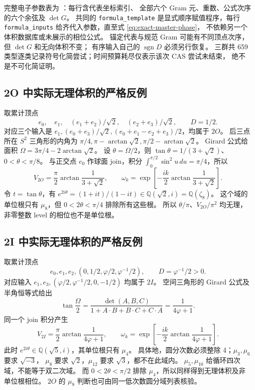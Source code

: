 完整电子参数表为 ：每行含代表坐标索引、
全部六个 Gram 元、重数、公式次序的六个余弦及 $\det G$。
共同的 \texttt{formula\_template} 是显式顺序赋值程序，每行
\texttt{formula\_inputs} 给齐代入参数，直至式 \eqref{eq:exact-master-phase}，
不依赖另一个体积数据库或未展示的相位公式。
锚定代表与规范 Gram 可能有不同顶点次序，但 $\det G$ 和无向体积不变；
有序输入自己的 $\operatorname{sgn}D$ 必须另行恢复。
三群共 659 类型逐类记录符号化简尝试；时间预算耗尽仅表示该次 CAS 尝试未结束，
绝不是不可化简证明。

\subsection{2O 中实际无理体积的严格反例}

取累计顶点
\[
e_0,\quad e_1,\quad (e_1+e_2)/\sqrt2,\quad(e_2+e_3)/\sqrt2,
\qquad D=1/2.
\]
对应三个输入是 $e_1,(e_0+e_3)/\sqrt2,(e_0+e_1-e_2+e_3)/2$，均属于 $2O$。
后三点所在 $S^2$ 三角形的内角为
$\pi/4,\pi-\arctan\sqrt2,\pi/2-\arctan\sqrt2$。
Girard 公式给面积 $\Omega=3\pi/4-2\arctan\sqrt2$。
设 $\theta=\Omega/2$，则
$\tan\theta=1/(3+\sqrt2)$、$0<\theta<\pi/8$。
与正交点 $e_0$ 作球面 join，积分 $\int_0^{\pi/2}\sin^2u\,du=\pi/4$，所以
\begin{equation}
\boxed{V_{2O}=\frac\pi2\arctan\frac1{3+\sqrt2}},\qquad
\omega_k=\exp\left[-\frac{ik}{2}\arctan\frac1{3+\sqrt2}\right].
\end{equation}
令 $t=\tan\theta$，有
$e^{2i\theta}=(1+it)/(1-it)\in\mathbb Q(\sqrt2,i)=\mathbb Q(\zeta_8)$。
这个域的单位根只有 $\mu_8$，但 $0<2\theta<\pi/4$ 排除所有这些根。
所以 $\theta/\pi$、$V_{2O}/\pi^2$ 均无理，非零整数 level 的相位也不是单位根。

\subsection{2I 中实际无理体积的严格反例}

取累计顶点
\[
 e_0,e_1,e_2,(0,1/2,\varphi/2,\varphi^{-1}/2),\qquad D=\varphi^{-1}/2>0.
\]
对应输入 $e_1,e_3,(\varphi/2,\varphi^{-1}/2,0,-1/2)$ 均属于 $2I$。
空间三角形的 Girard 公式及半角恒等式给出
\[
\tan\frac\Omega2=\frac{\det(A,B,C)}{1+A\cdot B+B\cdot C+C\cdot A}
 =\frac1{4\varphi+1}.
\]
同一个 join 积分产生
\begin{equation}
\boxed{V_{2I}=\frac\pi2\arctan\frac1{4\varphi+1}},\qquad
\omega_k=\exp\left[-\frac{ik}{2}\arctan\frac1{4\varphi+1}\right].
\end{equation}
此时 $e^{2i\theta}\in\mathbb Q(\sqrt5,i)$，其单位根只有 $\mu_4$。
具体地，圆分次数必须整除 4；$\mu_3,\mu_6$ 要求 $\sqrt{-3}$，
$\mu_8$ 要求 $\sqrt2$，$\mu_{12}$ 要求 $\sqrt3$，都不在此域内。
$\mu_5,\mu_{10}$ 给循环四次域，不能等于双二次域。
而 $0<2\theta<\pi/2$ 排除 $\mu_4$，所以同样得到无理体积及非单位根相位。
$2O$ 的 $\mu_8$ 判断也可由同一低次数圆分域列表核验。

